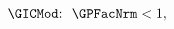   \begin{align}
    \text{{\GICMod}:~~}    \GPFacNrm  & < 1, \phantom{\text{{\GICMod}:~~}}\label{eq:GICMod}
  \end{align}
